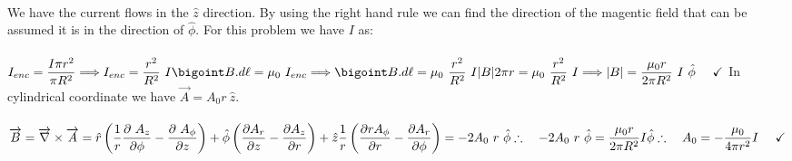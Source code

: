\documentclass[fleqn]{article}
\begin{document}
\begin{enumerate}
      \textcolor{hwColor}{
        \\
        We have the current flows in the $\hat{z}$ direction. By using the right hand rule we can find the direction of the magentic field 
        that can be assumed it is in the direction of $\hat{\phi}$. For this problem we have $I$ as: 
        \\
        \\
        $
          I_{enc}=\dfrac{I \pi r^2}{\pi R^2} \Longrightarrow I_{enc}=\dfrac{r^2}{R^2} ~ I
          \\
          \\
          \\
          \bigoint B.d\ell=\mu_0 ~ I_{enc} \Longrightarrow \bigoint B.d\ell=\mu_0 ~ \dfrac{r^2}{R^2} ~ I
          \\
          \\
          \\
          |B| 2 \pi r=\mu_0 ~ \dfrac{r^2}{R^2} ~ I \Longrightarrow |B|=\dfrac{\mu_0 r}{2 \pi R^2} ~ I ~ \hat{\phi} ~~~~ \checkmark
          \\
          \\
          \\
        $
        In cylindrical coordinate we have $\overrightarrow{A}=A_0 r ~ \hat{z}$.
        \\
        \\
        $
          \overrightarrow{B}= \overrightarrow{\nabla} \times \overrightarrow{A}
          =\hat{r} \left(\dfrac{1}{r} \dfrac{\partial ~ A_z}{\partial \phi}-\dfrac{\partial ~ A_{\phi}}{\partial z} \right)
          +\hat{\phi} \left(\dfrac{\partial A_r}{\partial z}-\dfrac{\partial A_z}{\partial r}\right)
          +\hat{z} \dfrac{1}{r} \left(\dfrac{\partial r A_{\phi}}{\partial r}-\dfrac{\partial A_r}{\partial \phi}\right)
          =-2A_0 ~ r ~ \hat{\phi}
          \\
          \\
          \\
          \therefore ~~~ -2A_0 ~ r ~ \hat{\phi}=\dfrac{\mu_0 r}{2 \pi R^2} I \hat{\phi}
          \\
          \\
          \\
          \therefore ~~~ A_0=-\dfrac{\mu_0}{4 \pi r^2}I ~~~~ \checkmark
        $
        \\
        \\
      }

      \pagebreak


\end{enumerate}
\end{document}
